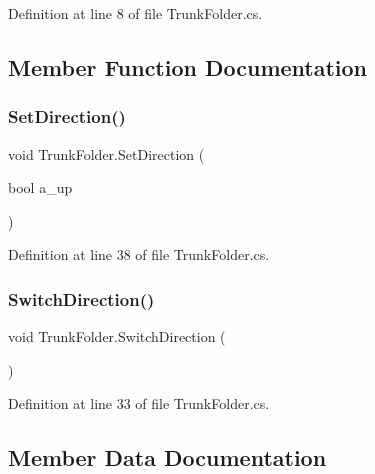 Definition at line 8 of file Trunk\+Folder.\+cs.



\subsection{Member Function Documentation}
\mbox{\label{class_trunk_folder_ac8c7e6097fe621bc041834bea9c17940}} 
\subsubsection{\texorpdfstring{Set\+Direction()}{SetDirection()}}
{\footnotesize\ttfamily void Trunk\+Folder.\+Set\+Direction (\begin{DoxyParamCaption}\item[{bool}]{a\+\_\+up }\end{DoxyParamCaption})}



Definition at line 38 of file Trunk\+Folder.\+cs.

\mbox{\label{class_trunk_folder_a877c0ee58132e7ec27436e691595cab4}} 
\subsubsection{\texorpdfstring{Switch\+Direction()}{SwitchDirection()}}
{\footnotesize\ttfamily void Trunk\+Folder.\+Switch\+Direction (\begin{DoxyParamCaption}{ }\end{DoxyParamCaption})}



Definition at line 33 of file Trunk\+Folder.\+cs.



\subsection{Member Data Documentation}
\mbox{\label{class_trunk_folder_aefe7232b2fbad90b1aefe33eeac6893b}} 
